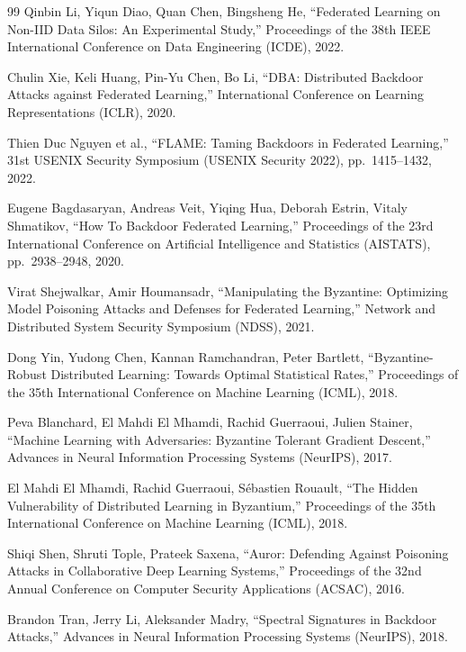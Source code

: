 \documentclass[a4j, twocolumn, dvipdfmx]{jsarticle}
\begin{document}
\begin{thebibliography}{99}
Qinbin Li, Yiqun Diao, Quan Chen, Bingsheng He,
``Federated Learning on Non-IID Data Silos: An Experimental Study,''
Proceedings of the 38th IEEE International Conference on Data Engineering (ICDE), 2022.

Chulin Xie, Keli Huang, Pin-Yu Chen, Bo Li,
``DBA: Distributed Backdoor Attacks against Federated Learning,''
International Conference on Learning Representations (ICLR), 2020.

Thien Duc Nguyen et al.,
``FLAME: Taming Backdoors in Federated Learning,''
31st USENIX Security Symposium (USENIX Security 2022), pp.~1415--1432, 2022.

Eugene Bagdasaryan, Andreas Veit, Yiqing Hua, Deborah Estrin, Vitaly Shmatikov,
``How To Backdoor Federated Learning,''
Proceedings of the 23rd International Conference on Artificial Intelligence and Statistics (AISTATS),
pp.~2938--2948, 2020.

Virat Shejwalkar, Amir Houmansadr,
``Manipulating the Byzantine: Optimizing Model Poisoning Attacks and Defenses for Federated Learning,''
Network and Distributed System Security Symposium (NDSS), 2021.

Dong Yin, Yudong Chen, Kannan Ramchandran, Peter Bartlett,
``Byzantine-Robust Distributed Learning: Towards Optimal Statistical Rates,''
Proceedings of the 35th International Conference on Machine Learning (ICML), 2018.

Peva Blanchard, El Mahdi El Mhamdi, Rachid Guerraoui, Julien Stainer,
``Machine Learning with Adversaries: Byzantine Tolerant Gradient Descent,''
Advances in Neural Information Processing Systems (NeurIPS), 2017.

El Mahdi El Mhamdi, Rachid Guerraoui, S\'ebastien Rouault,
``The Hidden Vulnerability of Distributed Learning in Byzantium,''
Proceedings of the 35th International Conference on Machine Learning (ICML), 2018.

Shiqi Shen, Shruti Tople, Prateek Saxena,
``Auror: Defending Against Poisoning Attacks in Collaborative Deep Learning Systems,''
Proceedings of the 32nd Annual Conference on Computer Security Applications (ACSAC), 2016.

Brandon Tran, Jerry Li, Aleksander Madry,
``Spectral Signatures in Backdoor Attacks,''
Advances in Neural Information Processing Systems (NeurIPS), 2018.


\end{thebibliography}
\end{document}
